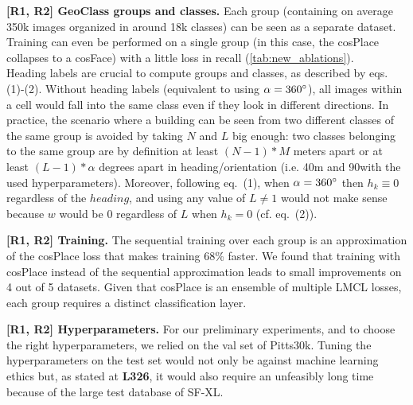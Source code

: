 \documentclass[10pt,twocolumn,letterpaper]{article}
\newcommand{\RI}{{\color{red}\textbf{R1}}}
\newcommand{\RII}{{\color{ForestGreen}\textbf{R2}}}
\newcommand{\myparagraph}[1]{\vspace{-0.5pt}\noindent\textbf{#1}}
\begin{document}
\myparagraph{[{\RI, \RII}] GeoClass groups and classes.} 
Each group (containing on average 350k images organized in around 18k classes) can be seen as a separate dataset. Training can even be performed on a single group (in this case, the cosPlace collapses to a cosFace) with a little loss in recall (\cref{tab:new_ablations}). \\
Heading labels are crucial to compute groups and classes, as described by eqs. (1)-(2).
Without heading labels (equivalent to using $\alpha=360\degree$), all images within a cell would fall into the same class even if they look in different directions.
In practice, the scenario where a building can be seen from two different classes of the same group is avoided by taking $N$ and $L$ big enough: two classes belonging to the same group are by definition at least $(N-1)*M$ meters apart or at least $(L-1)*\alpha$ degrees apart in heading/orientation (i.e. 40m and 90\degree with the used hyperparameters).
Moreover, following eq.~(1), when $\alpha=360\degree$ then $h_k\equiv0$ regardless of the $heading$, and using any value of $L\neq1$ would not make sense because $w$ would be $0$ regardless of $L$ when $h_k=0$ (cf. eq.~(2)).







\myparagraph{[{\RI, \RII}] Training.} 
The sequential training over each group is an approximation of the cosPlace loss that makes training 68\% faster.
We found that training with cosPlace instead of the sequential approximation leads to small improvements on 4 out of 5 datasets.
Given that cosPlace is an ensemble of multiple LMCL losses, each group requires a distinct classification layer.





\myparagraph{[{\RI, \RII}] Hyperparameters.} 
For our preliminary experiments, and to choose the right hyperparameters, we relied on the val set of Pitts30k. Tuning the hyperparameters on the test set would not only be against machine learning ethics but, as stated at \textbf{L326}, it would also require an unfeasibly long time because of the large test database of SF-XL.
\end{document}
